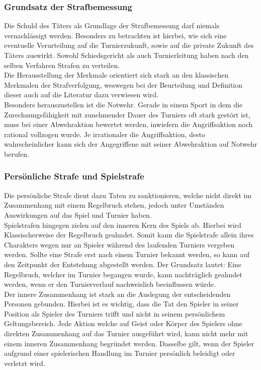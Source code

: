 \documentclass[a5paper, 12pt]{article}
\begin{document}
\subsubsection{Grundsatz der Strafbemessung}
Die Schuld des Täters als Grundlage der Strafbemessung darf niemals vernachlässigt werden. Besonders zu betrachten ist hierbei, wie sich eine eventuelle Verurteilung auf die Turnierzukunft, sowie auf die private Zukunft des Täters auswirkt. Sowohl Schiedsgericht als auch Turnierleitung haben nach den selben Verfahren Strafen zu verteilen. \\
Die Herausstellung der Merkmale orientiert sich stark an den klassischen Merkmalen der Strafverfolgung, weswegen bei der Beurteilung und Definition dieser auch auf die Literatur dazu verwiesen wird.\\
Besonders herauszustellen ist die Notwehr. Gerade in einem Sport in dem die Zurechnungsfähigkeit mit zunehmender Dauer des Turniers oft stark gestört ist, muss bei einer Abwehraktion bewertet werden, inwiefern die Angriffsaktion noch rational vollzogen wurde. Je irrationaler die Angriffsaktion, desto wahrscheinlicher kann sich der Angegriffene mit seiner Abwehraktion auf Notwehr berufen.\\
\subsubsection{Persönliche Strafe und Spielstrafe}
Die persönliche Strafe dient dazu Taten zu sanktionieren, welche nicht direkt im Zusammenhang mit einem Regelbruch stehen, jedoch unter Umständen Auswirkungen auf das Spiel und Turnier haben.\\
Spielstrafen hingegen zielen auf den inneren Kern des Spiels ab. Hierbei wird Klassischerweise der Regelbruch geahndet. Somit kann die Spielstrafe allein ihres Charakters wegen nur an Spieler während des laufenden Turniers vergeben werden. Sollte eine Strafe erst nach einem Turnier bekannt werden, so kann auf den Zeitpunkt der Entstehung abgestellt werden. Der Grundsatz lautet: Eine Regelbruch, welcher im Turnier begangen wurde, kann nachträglich geahndet werden, wenn er den Turnierverlauf nachweislich beeinflussen würde.\\
Der innere Zusammenhang ist stark an die Auslegung der entscheidenden Personen gebunden. Hierbei ist es wichtig, dass die Tat den Spieler in seiner Position als Spieler des Turniers trifft und nicht in seinem persönlichem Geltungsbereich. Jede Aktion welche auf Geist oder Körper des Spielers ohne direkten Zusammenhang auf das Turnier ausgeführt wird, kann nicht mehr mit einem inneren Zusammenhang begründet werden. Dasselbe gilt, wenn der Spieler aufgrund einer spielerischen Handlung im Turnier persönlich beleidigt oder verletzt wird. 
\end{document}
